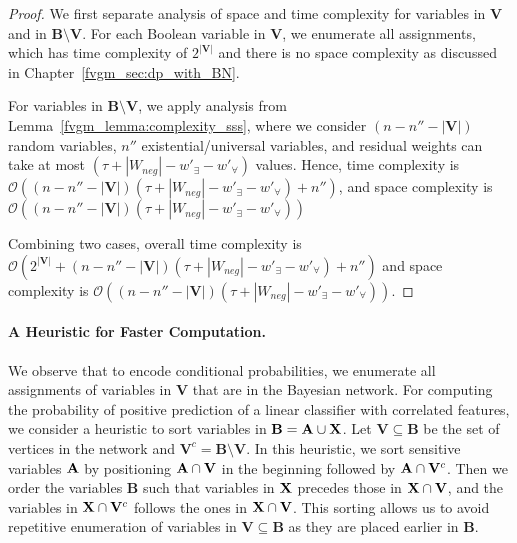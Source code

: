 \begin{proof}
	We first separate analysis of space and time complexity for variables in $ \mathbf{V} $ and in $\mathbf{B}\setminus \mathbf{V} $. For each Boolean variable in $ \mathbf{V} $, we enumerate all assignments, which has time complexity of $ 2^{|\mathbf{V}|} $ and there is no space complexity as discussed in Chapter~\ref{fvgm_sec:dp_with_BN}. 
	
	
	For variables in $\mathbf{B}\setminus \mathbf{V} $, we apply analysis from  Lemma~\ref{fvgm_lemma:complexity_sss}, where we consider $ (n - n'' - |\mathbf{V}|) $ random variables, $ n'' $ existential/universal variables, and residual weights can take at most $ (\tau + |W_{neg}| - w'_{\exists} - w'_{\forall}) $ values. Hence, time complexity is $ \mathcal{O}((n - n'' - |\mathbf{V}|)(\tau + |W_{neg}| - w'_{\exists} - w'_{\forall}) + n'') $, and space complexity is $ \mathcal{O}((n - n'' - |\mathbf{V}|)(\tau + |W_{neg}| - w'_{\exists} - w'_{\forall})) $ 
	
	Combining two cases, overall time complexity is $ \mathcal{O}(2^{|\mathbf{V}|} + (n - n'' - |\mathbf{V}|)(\tau + |W_{neg}| - w'_{\exists} - w'_{\forall}) + n'') $ and space complexity is $ \mathcal{O}((n - n'' - |\mathbf{V}|)(\tau + |W_{neg}| - w'_{\exists} - w'_{\forall})) $. 
\end{proof}

\paragraph{A Heuristic for Faster Computation.} We observe that to encode conditional probabilities, we enumerate all assignments of variables in $ \mathbf{V} $ that are in the Bayesian network. For computing the probability of positive prediction of a linear classifier with correlated features, we consider a heuristic to sort variables in $ \mathbf{B} = \mathbf{A} \cup \mathbf{X} $. Let $ \mathbf{V} \subseteq \mathbf{B} $ be the set of vertices in the network and $ \mathbf{V}^c = \mathbf{B} \setminus \mathbf{V} $. In this heuristic, we sort sensitive variables $ \mathbf{A} $ by positioning $ \mathbf{A} \cap \mathbf{V} $ in the beginning followed by $ \mathbf{A} \cap \mathbf{V}^c $. Then we order the variables $ \mathbf{B} $ such that variables in $ \mathbf{X} $ precedes those in $ \mathbf{X} \cap \mathbf{V} $, and the variables in $ \mathbf{X} \cap \mathbf{V}^c $ follows the ones in $ \mathbf{X} \cap \mathbf{V} $. This sorting allows us to avoid repetitive enumeration of variables in $ \mathbf{V} \subseteq \mathbf{B} $ as they are placed earlier in $ \mathbf{B} $.

